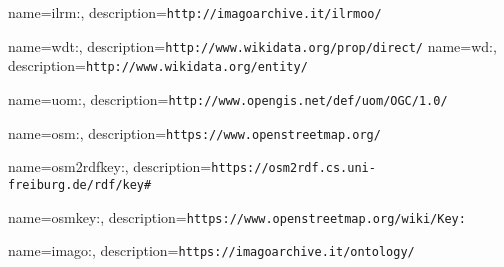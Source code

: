 {       name={ilrm:},
        description={\texttt{http://imagoarchive.it/ilrmoo/}}
}

{       name={wdt:},
        description={\texttt{http://www.wikidata.org/prop/direct/}}
}
{       name={wd:},
        description={\texttt{http://www.wikidata.org/entity/}}
}

{       name={uom:},
        description={\texttt{http://www.opengis.net/def/uom/OGC/1.0/}}
}

{       name={osm:},
        description={\texttt{https://www.openstreetmap.org/}}
}

{       name={osm2rdfkey:},
        description={\texttt{https://osm2rdf.cs.uni-freiburg.de/rdf/key#}}
}

{       name={osmkey:},
        description={\texttt{https://www.openstreetmap.org/wiki/Key:}}
}

{       name={imago:},
        description={\texttt{https://imagoarchive.it/ontology/}}
}










